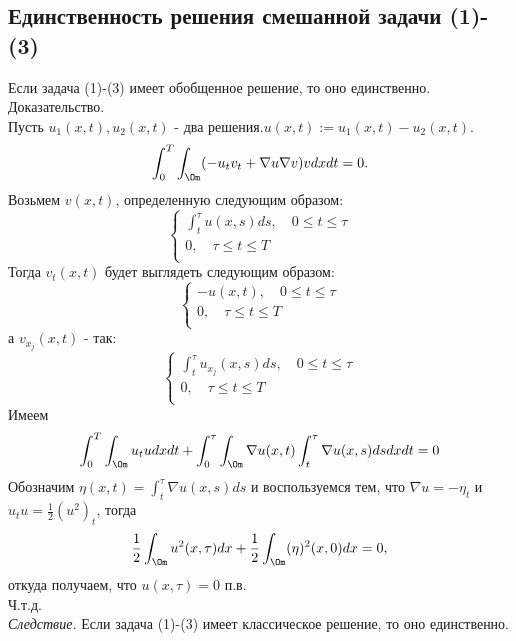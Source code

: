 \documentclass[a4paper,draft]{article}
\begin{document}
\subsection{Единственность решения смешанной задачи (1)-(3)}
Если задача (1)-(3) имеет обобщенное решение, то оно
единственно.\\
Доказательство.\\
Пусть $u_1(x,t),u_2(x,t)$ - два
решения.$u(x,t):=u_1(x,t)-u_2(x,t)$.
$$
\int_0^T\int_{\Om}(-u_tv_t+\nabla u\nabla v)vdxdt=0.
$$
Возьмем $v(x,t)$, определенную следующим образом:
$$
\left\{
\begin{aligned}
\int_t^{\tau}u(x,s)ds,\quad 0\le t\le\tau\\
0,\quad \tau\le t\le T\\
\end{aligned}
\right.
$$
Тогда $v_t(x,t)$ будет выглядеть следующим образом:
$$
\left\{
\begin{aligned}
-u(x,t),\quad 0\le t\le\tau\\
0,\quad \tau\le t\le T\\
\end{aligned}
\right.
$$
а $v_{x_j}(x,t)$ - так:
$$
\left\{
\begin{aligned}
\int_t^{\tau}u_{x_j}(x,s)ds,\quad 0\le t\le\tau\\
0,\quad \tau\le t\le T\\
\end{aligned}
\right.
$$
Имеем
$$
\int_0^T\int_{\Om}u_tudxdt + \int_0^{\tau}\int_{\Om}\nabla
u(x,t)\int_t^{\tau}\nabla u(x,s)dsdxdt=0
$$
Обозначим $\eta(x,t)=\int_t^{\tau}\nabla u(x,s)ds$ и воспользуемся
тем, что $\nabla u=-\eta_t$ и $u_tu=\frac{1}{2}(u^2)_t$, тогда
$$
\frac{1}{2}\int_{\Om}u^2(x,\tau)dx + \frac{1}{2}\int_{\Om}(\eta)^2(x,0)dx=0,
$$
откуда получаем, что $u(x,\tau)=0$ п.в.\\
Ч.т.д.\\
\textit{Следствие.} Если задача (1)-(3) имеет классическое
решение, то оно единственно.
\end{document}
